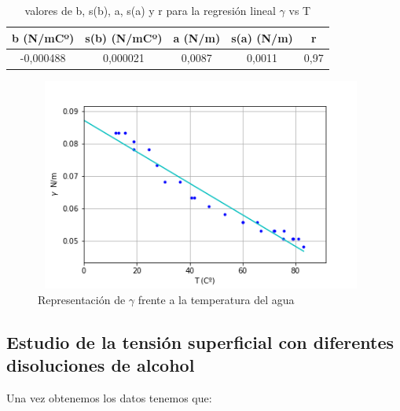 \documentclass[12pt,a4paper]{book}
\begin{document}
\begin{table}
\begin{center}
\begin{tabular}{|c|c|c|c|c|}
\hline
b (N/mCº) & s(b) (N/mCº) & a (N/m) & s(a) (N/m) & r \\ \hline
-0,000488 & 0,000021 & 0,0087 & 0,0011 & 0,97 \\ \hline
\end{tabular}
\caption{valores de b, s(b), a, s(a) y r para la regresión lineal $\gamma$ vs T}
\label{tab: t vs ganmma: b, s(b), a, s(a), r}
\end{center}
\end{table}



\begin{figure}[h!] %
\centering
\includegraphics[width=11cm, height=7cm]{plot1-tensionsuperficial.png}
\caption{Representación de $\gamma$ frente a la temperatura del agua}
\label{fig:plot1-tensiónsuperfical}
\end{figure}

\newpage

\subsection{Estudio de la tensión superficial con diferentes disoluciones de alcohol} 
Una vez obtenemos los datos tenemos que:
\end{document}
